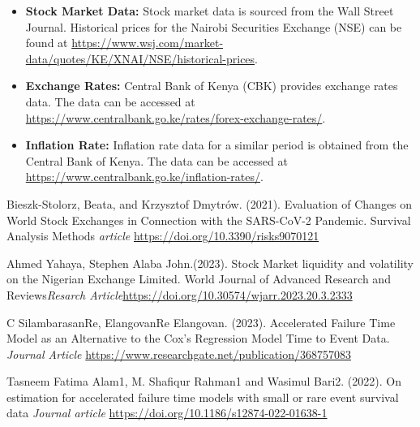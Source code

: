 \documentclass[twoside,a4paper,12pt]{article}
\begin{document}
\begin{itemize}
    \item \textbf{Stock Market Data:} Stock market data is sourced from the Wall Street Journal. Historical prices for the Nairobi Securities Exchange (NSE) can be found at \url{https://www.wsj.com/market-data/quotes/KE/XNAI/NSE/historical-prices}.
    \item \textbf{Exchange Rates:} Central Bank of Kenya (CBK) provides exchange rates data. The data can be accessed at \url{https://www.centralbank.go.ke/rates/forex-exchange-rates/}.
    \item \textbf{Inflation Rate:} Inflation rate data for a similar period is obtained from the Central Bank of Kenya. The data can be accessed at \url{https://www.centralbank.go.ke/inflation-rates/}.


\end{itemize}
\begin{thebibliography}{}
Bieszk-Stolorz, Beata, and Krzysztof Dmytrów. (2021). Evaluation of Changes on World Stock Exchanges in Connection with the SARS-CoV-2 Pandemic. Survival Analysis Methods \textit{article} \newblock\href{https://doi.org/10.3390/risks9070121}{https://doi.org/10.3390/risks9070121}


 Ahmed Yahaya, Stephen Alaba John.(2023). Stock Market liquidity and volatility on the Nigerian Exchange Limited. World Journal of Advanced Research and Reviews\textit{Resarch Article}\newblock\href{https://doi.org/10.30574/wjarr.2023.20.3.2333}{https://doi.org/10.30574/wjarr.2023.20.3.2333}

C SilambarasanRe, ElangovanRe Elangovan. (2023). Accelerated Failure Time Model as an Alternative to the Cox's Regression Model Time to Event Data. \textit{Journal Article} \newblock\href{https://www.researchgate.net/publication/368757083}{https://www.researchgate.net/publication/368757083}

Tasneem Fatima Alam1, M. Shafiqur Rahman1 and Wasimul Bari2. (2022). On estimation for accelerated failure
time models with small or rare event survival data \textit{Journal article} \newblock \href{https://doi.org/10.1186/s12874-022-01638-1}{https://doi.org/10.1186/s12874-022-01638-1}


\end{thebibliography}
\end{document}
